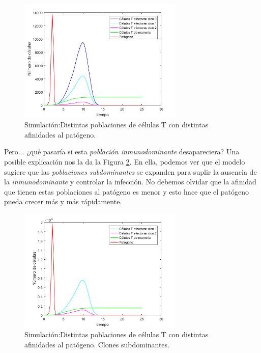 \begin{figure}[t]
	\centering
	\includegraphics[width=0.7\textwidth]{Imagenes/Simulaciones/tresClones}
	\caption{Simulación:Distintas poblaciones de células T con distintas afinidades al patógeno.}
	\label{fig:tresClones}
\end{figure}


Pero... ¿qué pasaría si esta \textit{población inmunodominante} desapareciera? Una posible explicación nos la da la Figura \ref{fig:dosClones}. En ella, podemos ver que el modelo sugiere que las \textit{poblaciones subdominantes} se expanden para suplir la ausencia de la \textit{inmunodominante} y controlar la infección. No debemos olvidar que la afinidad que tienen estas poblaciones al patógeno es menor y esto hace que el patógeno pueda crecer más y más rápidamente. 


\begin{figure}[t]
	\centering
	\includegraphics[width=0.7\textwidth]{Imagenes/Simulaciones/dosClones}
	\caption{Simulación:Distintas poblaciones de células T con distintas afinidades al patógeno. Clones subdominantes.}
	\label{fig:dosClones}
\end{figure}

